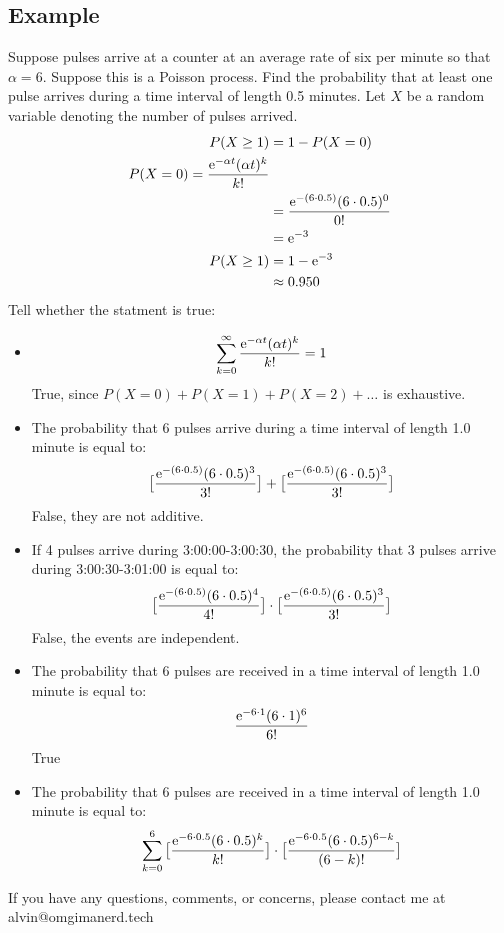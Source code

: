 \documentclass[letterpaper, 12pt]{math}
\begin{document}
\subsection*{Example}
Suppose pulses arrive at a counter at an average rate of six per minute so that
\( \alpha = 6 \). Suppose this is a Poisson process. Find the probability that
at least one pulse arrives during a time interval of length 0.5 minutes. Let
\( X \) be a random variable denoting the number of pulses arrived.
\begin{align*}
  P(X\geq 1) &= 1-P(X=0) \\
  P(X=0) = \frac{\mathrm{e}^{-\alpha t}(\alpha t)^{k}}{k!} \\
  &= \frac{\mathrm{e}^{-(6\cdot 0.5)}(6\cdot 0.5)^{0}}{0!} \\
  &= \mathrm{e}^{-3} \\
  P(X\geq 1) &= 1-\mathrm{e}^{-3} \\
  &\approx 0.950
\end{align*}
Tell whether the statment is true:
\begin{itemize}
  \item
    \[ \sum_{k=0}^{\infty}\frac{\mathrm{e}^{-\alpha t}(\alpha t)^{k}}{k!} = 1 \]
    True, since \( P(X=0)+P(X=1)+P(X=2)+\dots \) is exhaustive.
  \item The probability that 6 pulses arrive during a time interval of length
    1.0 minute is equal to:
    \[ \big[\frac{\mathrm{e}^{-(6\cdot 0.5)}(6\cdot 0.5)^{3}}{3!}\big] +
       \big[\frac{\mathrm{e}^{-(6\cdot 0.5)}(6\cdot 0.5)^{3}}{3!}\big] \]
    False, they are not additive.
  \item If 4 pulses arrive during 3:00:00-3:00:30, the probability that 3 pulses
    arrive during 3:00:30-3:01:00 is equal to:
    \[ \big[\frac{\mathrm{e}^{-(6\cdot 0.5)}(6\cdot 0.5)^{4}}{4!}\big]\cdot
       \big[\frac{\mathrm{e}^{-(6\cdot 0.5)}(6\cdot 0.5)^{3}}{3!}\big] \]
    False, the events are independent.
  \item The probability that 6 pulses are received in a time interval of
    length 1.0 minute is equal to:
    \[ \frac{\mathrm{e}^{-6\cdot 1}(6\cdot 1)^{6}}{6!} \]
    True
  \item The probability that 6 pulses are received in a time interval of
    length 1.0 minute is equal to:
    \[ \sum_{k=0}^{6}\big[\frac{\mathrm{e}^{-6\cdot 0.5}(6\cdot 0.5)^{k}}{k!}\big]\cdot
       \big[\frac{\mathrm{e}^{-6\cdot 0.5}(6\cdot 0.5)^{6-k}}{(6-k)!}\big] \]
\end{itemize}

\begin{center}
  If you have any questions, comments, or concerns, please contact me at
  alvin@omgimanerd.tech
\end{center}
\end{document}
